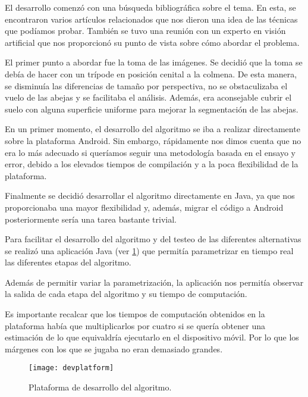 El desarrollo comenzó con una búsqueda bibliográfica sobre el tema. En
esta, se encontraron varios artículos relacionados que nos dieron una
idea de las técnicas que podíamos probar. También se tuvo una reunión
con un experto en visión artificial que nos proporcionó su punto de
vista sobre cómo abordar el problema.

El primer punto a abordar fue la toma de las imágenes. Se decidió que la
toma se debía de hacer con un trípode en posición cenital a la colmena.
De esta manera, se disminuía las diferencias de tamaño por perspectiva,
no se obstaculizaba el vuelo de las abejas y se facilitaba el análisis.
Además, era aconsejable cubrir el suelo con alguna superficie uniforme
para mejorar la segmentación de las abejas.


En un primer momento, el desarrollo del algoritmo se iba a realizar
directamente sobre la plataforma Android. Sin embargo, rápidamente nos
dimos cuenta que no era lo más adecuado si queríamos seguir una
metodología basada en el ensayo y error, debido a los elevados tiempos
de compilación y a la poca flexibilidad de la plataforma.

Finalmente se decidió desarrollar el algoritmo directamente en Java, ya
que nos proporcionaba una mayor flexibilidad y, además, migrar el código
a Android posteriormente sería una tarea bastante trivial.

Para facilitar el desarrollo del algoritmo y del testeo de las
diferentes alternativas se realizó una aplicación Java (ver \ref{fig:devplatform1}) 
que permitía parametrizar en tiempo real las diferentes etapas del algoritmo.

Además de permitir variar la parametrización, la aplicación nos permitía
observar la salida de cada etapa del algoritmo y su tiempo de
computación.

Es importante recalcar que los tiempos de computación obtenidos en la
plataforma había que multiplicarlos por cuatro si se quería obtener una
estimación de lo que equivaldría ejecutarlo en el dispositivo móvil. Por
lo que los márgenes con los que se jugaba no eran demasiado grandes.

\begin{figure}[H]
	\centering
	\texttt{[image: devplatform]}
	\caption{Plataforma de desarrollo del algoritmo.}
	\label{fig:devplatform1}
\end{figure}

